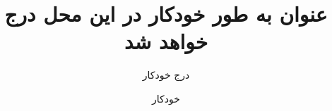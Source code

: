 \title{عنوان به طور خودکار در این محل درج خواهد شد}
\author{درج خودکار}
\newcommand{\otherauthors}{—}
\newcommand{\scope}{درج خودکار}
\newcommand{\labels}{درج خودکار}
\newcommand{\version}{درج خودکار}
\newcommand{\id}{automatic-id}
\newcommand{\hash}{automatic-hash}
\newcommand{\changelog}{درج خودکار & درج خودکار & درج خودکار & درج خودکار \\}
\date{خودکار}

